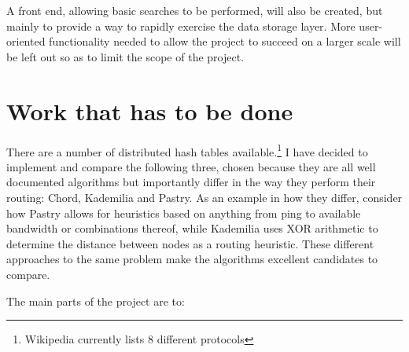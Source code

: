 A front end, allowing basic searches to be performed, will also be created, but mainly to provide a way to rapidly exercise the data storage layer. More user-oriented functionality needed to allow the project to succeed on a larger scale will be left out so as to limit the scope of the project.

\section*{Work that has to be done}

There are a number of distributed hash tables available.\footnote{ Wikipedia currently lists 8 different protocols } I have decided to implement and compare the following three, chosen because they are all well documented algorithms but importantly differ in the way they perform their routing: Chord, Kademilia and Pastry. As an example in how they differ, consider how Pastry allows for heuristics based on anything from ping to available bandwidth or combinations thereof, while Kademilia uses XOR arithmetic to determine the distance between nodes as a routing heuristic. These different approaches to the same problem make the algorithms excellent candidates to compare.

The main parts of the project are to:


